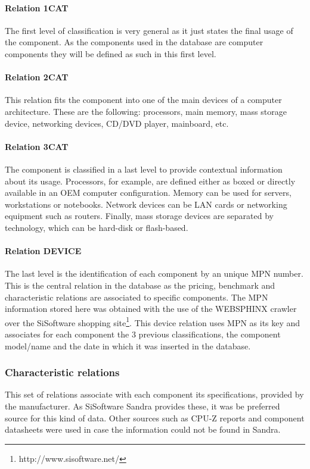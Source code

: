         \paragraph*{Relation 1CAT}
            The first level of classification is very general as it just states the final usage of the component. As the components used in the database are computer components they will be defined as such in this first level.

        \paragraph*{Relation 2CAT}
            This relation fits the component into one of the main devices of a computer architecture. These are the following: processors, main memory, mass storage device, networking devices, CD/DVD player, mainboard, etc.

        \paragraph*{Relation 3CAT}
            The component is classified in a last level to provide contextual information about its usage. Processors, for example, are defined either as boxed or directly available in an OEM computer configuration. Memory can be used for servers, workstations or notebooks. Network devices can be LAN cards or networking equipment such as routers. Finally, mass storage devices are separated by technology, which can be hard-disk or flash-based.

        \paragraph*{Relation DEVICE}
            The last level is the identification of each component by an unique MPN number. This is the central relation in the database as the pricing, benchmark and characteristic relations are associated to specific components. The MPN information stored here was obtained with the use of the WEBSPHINX crawler over the SiSoftware shopping site\footnote{http://www.sisoftware.net/}. This device relation uses MPN as its key and associates for each component the 3 previous classifications, the component model/name and the date in which it was inserted in the database.
            
    \subsubsection*{Characteristic relations}
        This set of relations associate with each component its specifications, provided by the manufacturer. As SiSoftware Sandra provides these, it was be preferred source for this kind of data. Other sources such as CPU-Z reports and component datasheets were used in case the information could not be found in Sandra.
